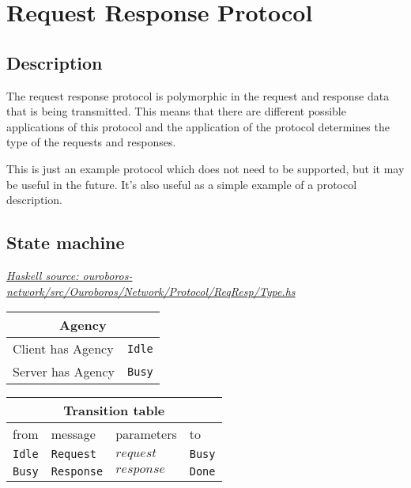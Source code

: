 \documentclass{report}
\newcommand{\hsref}[1]{\href{https://github.com/input-output-hk/ouroboros-network/blob/master/#1}{\emph{Haskell source: #1}}}
\newcommand{\state}[1]{\texttt{#1}}
\newcommand{\msg}[1]{\texttt{#1}}
\newcommand{\Idle}{\state{Idle}}
\newcommand{\Busy}{\state{Busy}}
\newcommand{\Done}{\state{Done}}
\theoremstyle{definition}{
  \newtheorem{lemma}{Lemma}[section] %
  \newtheorem{definition}[lemma]{Definition}
}
\theoremstyle{theorem}{
  \newtheorem{invariant}[lemma]{Invariant}
  \newtheorem{proofobligation}[lemma]{Proof Obligation}
}
\numberwithin{equation}{lemma}
\begin{document}
\section{Request Response Protocol}
\label{request-response-protocol}
\renewcommand{\Idle}{\state{Idle}}
\renewcommand{\Busy}{\state{Busy}}
\renewcommand{\Done}{\state{Done}}
\newcommand{\Request}{\msg{Request}}
\newcommand{\Response}{\msg{Response}}

\subsection{Description}
The request response protocol is polymorphic in the request and response data that is being transmitted.
This means that there are different possible applications of this protocol and the
application of the protocol determines the type of the requests and responses.

This is just an example protocol which does not need to be supported, but it
may be useful in the future.  It's also useful as a simple example of
a protocol description.

\subsection{State machine}
\hsref{ouroboros-network/src/Ouroboros/Network/Protocol/ReqResp/Type.hs}

\begin{tabular}{|l|l|}
  \hline
  \multicolumn{2}{|c|}{Agency} \\ \hline
  Client has Agency & \Idle \\  \hline
  Server has Agency & \Busy \\ \hline
\end{tabular}


\begin{tabular}{|l|l|l|l|} \hline
\multicolumn{4}{|c|}{Transition table} \\ \hline
  from         & message            & parameters             & to       \\ \hline\hline
  \Idle        & \Request           & $request$              & \Busy     \\ \hline
  \Busy        & \Response          & $response$             & \Done     \\ \hline
\end{tabular}
\end{document}
